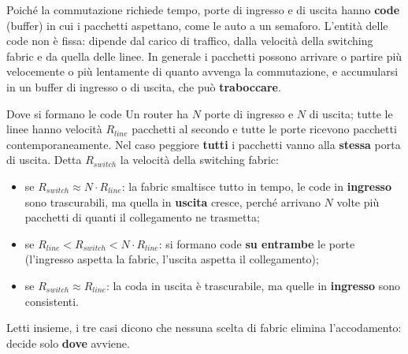 Poiché la commutazione richiede tempo, porte di ingresso e di uscita hanno \textbf{code} (buffer) in cui i pacchetti
aspettano, come le auto a un semaforo. L'entità delle code non è fissa: dipende dal carico di traffico, dalla velocità
della switching fabric e da quella delle linee. In generale i pacchetti possono arrivare o partire più velocemente o
più lentamente di quanto avvenga la commutazione, e accumularsi in un buffer di ingresso o di uscita, che può
\textbf{traboccare}.

\begin{esempio}{Dove si formano le code}
Un router ha $N$ porte di ingresso e $N$ di uscita; tutte le linee hanno velocità $R_{line}$ pacchetti al secondo e tutte
le porte ricevono pacchetti contemporaneamente. Nel caso peggiore \textbf{tutti} i pacchetti vanno alla \textbf{stessa}
porta di uscita. Detta $R_{switch}$ la velocità della switching fabric:
\begin{itemize}
    \item se $R_{switch} \approx N \cdot R_{line}$: la fabric smaltisce tutto in tempo, le code in \textbf{ingresso} sono
          trascurabili, ma quella in \textbf{uscita} cresce, perché arrivano $N$ volte più pacchetti di quanti il collegamento ne trasmetta;
    \item se $R_{line} < R_{switch} < N \cdot R_{line}$: si formano code \textbf{su entrambe} le porte (l'ingresso aspetta la
          fabric, l'uscita aspetta il collegamento);
    \item se $R_{switch} \approx R_{line}$: la coda in uscita è trascurabile, ma quelle in \textbf{ingresso} sono consistenti.
\end{itemize}
\end{esempio}

Letti insieme, i tre casi dicono che nessuna scelta di fabric elimina l'accodamento: decide solo \textbf{dove} avviene.


